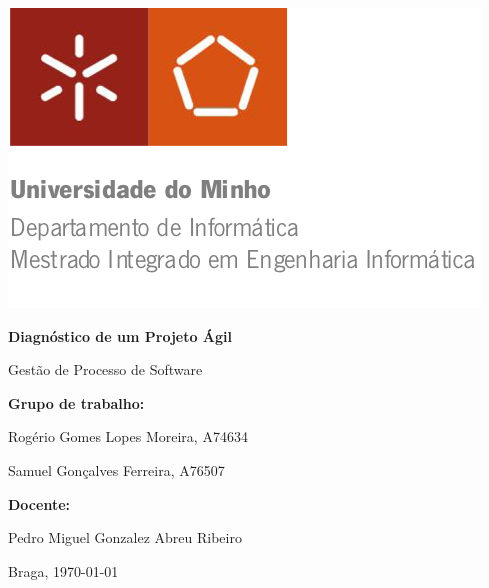 \begin{titlepage}


\begin{minipage}{0.6\textwidth}
\begin{flushleft} 
\includegraphics[width=\textwidth]{./Imagens/logo.png}
\end{flushleft}
\end{minipage}

\vspace{3cm}

\Huge

\textbf{Diagnóstico de um Projeto Ágil}

\LARGE

Gestão de Processo de Software 

\vfill

\normalsize

\textbf{Grupo de trabalho:}

Rogério Gomes Lopes Moreira, A74634

Samuel Gonçalves Ferreira, A76507

\vspace{5mm}

\textbf{Docente:}

Pedro Miguel Gonzalez Abreu Ribeiro


\vfill

Braga, {\today}

\end{titlepage}

\restoregeometry
